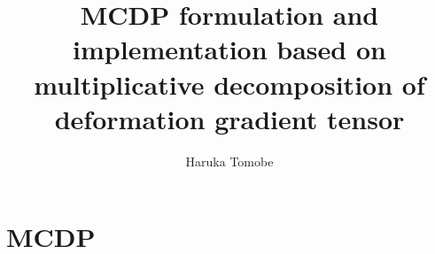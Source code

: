 \documentclass[11pt]{article}
\title{MCDP formulation and implementation based on multiplicative decomposition of deformation gradient tensor}
\author{Haruka Tomobe}
\date{}
\begin{document}
\maketitle
    \section{MCDP}
        
\end{document}
